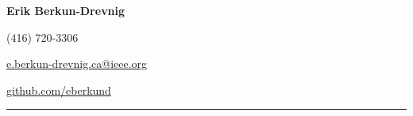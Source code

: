 \noindent
\begin{minipage}[b]{0.6\textwidth}
\Huge\textbf{Erik Berkun-Drevnig}
\end{minipage}
\begin{minipage}[b]{0.4\textwidth}
\begin{flushright}%
(416) 720-3306\par
\href{mailto:e.berkun-drevnig.ca@ieee.org}{e.berkun-drevnig.ca@ieee.org}\par
\href{https://github.com/eberkund}{github.com/eberkund}\par
\end{flushright}
\end{minipage}
\smallskip
\hrule
\smallskip